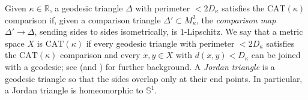 \documentclass[a4paper,leqno]{amsart}
\numberwithin{equation}{section}
\theoremstyle{remark}
\theoremstyle{remark}
\renewcommand{\S}{\mathbb{S}}
\newcommand{\R}{\mathbb{R}}
\begin{document}
Given $\kappa \in \R$, a geodesic triangle $\Delta$ with perimeter $< 2D_\kappa$ satisfies the $\mathrm{CAT}(\kappa)$ comparison if, given a comparison triangle $\Delta' \subset M^{2}_\kappa$, the \emph{comparison map} $\Delta' \to \Delta$, sending sides to sides isometrically, is $1$-Lipschitz. We say that a metric space $X$ is $\mathrm{CAT}(\kappa)$ if every geodesic triangle with perimeter $< 2D_\kappa$ satisfies the $\mathrm{CAT}(\kappa)$ comparison and every $x, y \in X$ with $d(x,y) < D_\kappa$ can be joined with a geodesic; see \cite{bridson-haefliger-1999-metric-spaces-of-non-positive-curvature} (and \cite{alexander-kapovitch-petrunin-2024-alexandrov-geometry-foundations}) for further background. A \emph{Jordan triangle} is a geodesic triangle so that the sides overlap only at their end points. In particular, a Jordan triangle is homeomorphic to $\S^1$.
\end{document}
